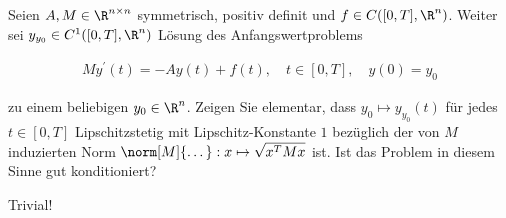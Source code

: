 \begin{exercise}

Seien $A, M \in \R^{n \times n}$ symmetrisch, positiv definit und $f \in C([0, T], \R^n)$. Weiter sei $y_{y_0} \in C^1([0, T], \R^n)$ Lösung des Anfangswertproblems

\begin{align*}
  M y^\prime(t) = -A y(t) + f(t),
  \quad
  t \in [0, T],
  \quad
  y(0) = y_0
\end{align*}

zu einem beliebigen $y_0 \in \R^n$.
Zeigen Sie elementar, dass $y_0 \mapsto y_{y_0}(t)$ für jedes $t \in [0, T]$ Lipschitzstetig mit Lipschitz-Konstante $1$ bezüglich der von $M$ induzierten Norm $\norm[M]{\dots}: x \mapsto \sqrt{x^T M x}$ ist.
Ist das Problem in diesem Sinne gut konditioniert?

\end{exercise}

\begin{solution}

Trivial!

\end{solution}
